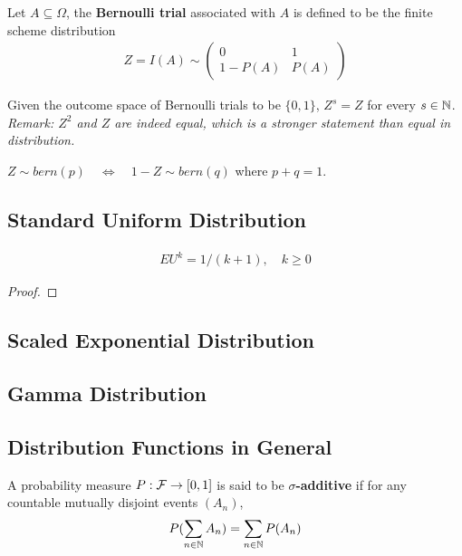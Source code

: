 \documentclass{article}
\begin{document}
   	\begin{remark}
   		Let $A \subseteq \Omega$, the \textbf{Bernoulli trial} associated with $A$ is defined to be the finite scheme distribution
   		\begin{align}
   			Z=I(A) \sim\left(\begin{array}{cc}{0} & {1} \\ {1-P(A)} & {P(A)}\end{array}\right)
   		\end{align}
   	\end{remark}
   	
   	\begin{proposition}[Invariance]
   		Given the outcome space of Bernoulli trials to be $\{0, 1\}$, $Z^s = Z$ for every $s \in \mathbb{N}$. \\
   		\emph{Remark: $Z^2$ and $Z$ are indeed equal, which is a stronger statement than equal in distribution.}
   	\end{proposition}
   	
   	\begin{proposition}[Negation]
   		$Z \sim bern(p) \quad \Leftrightarrow \quad 1-Z \sim bern(q)$ where $p + q = 1$.
   	\end{proposition}
   	
   	\subsection{Standard Uniform Distribution}
   	
   	\begin{theorem}
   		\begin{align}
   			E U^{k}=1 /(k+1), \quad k \geq 0
   		\end{align}
   	\end{theorem}
   	
   	\begin{proof}
   	\end{proof}
   	
   	\subsection{Scaled Exponential Distribution}
   	
   	\subsection{Gamma Distribution}
   	
   	\subsection{Distribution Functions in General}
   	\begin{definition}
   		A probability measure $P: \mathcal{{F}} \to [0, 1]$ is said to be \textbf{$\sigma$-additive} if for any countable mutually disjoint events $(A_n)$,
   		\begin{align}
   			P(\sum_{n \in \mathbb{N}} A_n) = \sum_{n \in \mathbb{N}} P(A_n)
   		\end{align}
   	\end{definition}
   	
\end{document}
